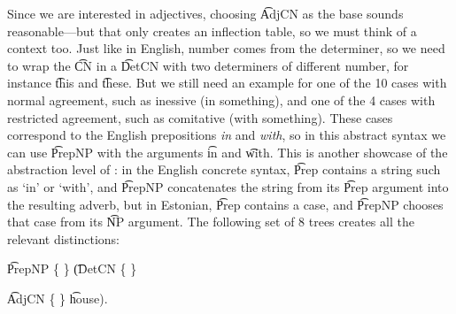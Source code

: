 

\noindent Since we are interested in adjectives, choosing \t{AdjCN} as
the base sounds reasonable---but that only creates an inflection
table, so we must think of a context too. Just like in English, number
comes from the determiner, so we need to wrap the \t{CN} in a \t{DetCN}
with two determiners of different number, for instance \t{this} and
\t{these}. But we still need an example for one of the 10 cases with
normal agreement, such as inessive (in something), and one of the 4
cases with restricted agreement, such as comitative (with something).
These cases correspond to the English prepositions \emph{in} and \emph{with},
so in this abstract syntax we can use \t{PrepNP} with the arguments
\t{in} and \t{with}. This is another showcase of the abstraction level
of \gf{}: in the English concrete syntax, \t{Prep} contains a string
such as `in' or `with', and \t{PrepNP} concatenates the string from its
\t{Prep} argument into the resulting adverb, but in Estonian, \t{Prep}
contains a case, and \t{PrepNP} chooses that case from its \t{NP} argument.
The following set of 8 trees creates all the relevant
distinctions:
\begin{EmptyItem}
 \t{PrepNP}  \{  \}
             \t{(DetCN}  \{  \}

             \t{AdjCN}  \{ \}
             \t{house)}.
\end{EmptyItem}
